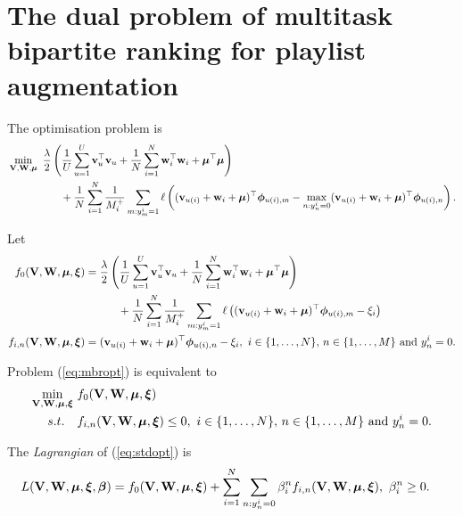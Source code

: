 \section{The dual problem of multitask bipartite ranking for playlist augmentation}

The optimisation problem is
\begin{equation}
\label{eq:mbropt}
\begin{aligned}
&\min_{\mathbf{V}, \mathbf{W}, \bm{\mu}} \ \frac{\lambda}{2} \left( \frac{1}{U} \sum_{u=1}^U \mathbf{v}_u^\top \mathbf{v}_u 
     + \frac{1}{N} \sum_{i=1}^N \mathbf{w}_i^\top \mathbf{w}_i + \bm{\mu}^\top \bm{\mu} \right) \\
& \hspace{5em}
     + \frac{1}{N} \sum_{i=1}^N \frac{1}{M_i^+} \sum_{m: y_m^i = 1} \ell \left( (\mathbf{v}_{u(i)} + \mathbf{w}_i + \bm{\mu})^\top \bm{\phi}_{u(i),m} 
     - \max_{n: y_n^i = 0} (\mathbf{v}_{u(i)} + \mathbf{w}_i + \bm{\mu})^\top \bm{\phi}_{u(i),n} \right).
\end{aligned}
\end{equation}

Let 
\begin{equation*}
\begin{aligned}
f_0(\mathbf{V}, \mathbf{W}, \bm{\mu}, \bm{\xi}) &= \frac{\lambda}{2} \left( \frac{1}{U} \sum_{u=1}^U \mathbf{v}_u^\top \mathbf{v}_u 
     + \frac{1}{N} \sum_{i=1}^N \mathbf{w}_i^\top \mathbf{w}_i + \bm{\mu}^\top \bm{\mu} \right) \\
& \hspace{3em} 
     + \frac{1}{N} \sum_{i=1}^N \frac{1}{M_i^+} \sum_{m: y_m^i = 1} 
       \ell \left( (\mathbf{v}_{u(i)} + \mathbf{w}_i + \bm{\mu})^\top \bm{\phi}_{u(i),m} - \xi_i \right) \\
f_{i,n} (\mathbf{V}, \mathbf{W}, \bm{\mu}, \bm{\xi}) &= (\mathbf{v}_{u(i)} + \mathbf{w}_i + \bm{\mu})^\top \bm{\phi}_{u(i),n} - \xi_i, \
i \in \{1,\dots,N\}, \, n \in \{1,\dots,M\} \ \mathrm{and} \ y_n^i = 0.
\end{aligned}
\end{equation*}

Problem (\ref{eq:mbropt}) is equivalent to 
\begin{equation}
\label{eq:stdopt}
\begin{aligned}
\min_{\mathbf{V}, \mathbf{W}, \bm{\mu}, \bm{\xi}} \ & f_0(\mathbf{V}, \mathbf{W}, \bm{\mu}, \bm{\xi}) \\
s.t. \quad & f_{i,n}(\mathbf{V}, \mathbf{W}, \bm{\mu}, \bm{\xi}) \le 0, \
i \in \{1,\dots,N\}, \, n \in \{1,\dots,M\} \ \mathrm{and} \ y_n^i = 0.
\end{aligned}
\end{equation}

The \emph{Lagrangian} of (\ref{eq:stdopt}) is
\begin{equation*}
\begin{aligned}
L(\mathbf{V}, \mathbf{W}, \bm{\mu}, \bm{\xi}, {\bm{\beta}}) 
&= f_0(\mathbf{V}, \mathbf{W}, \bm{\mu}, \bm{\xi}) + \sum_{i=1}^N \sum_{n: y_n^i = 0} \beta_i^n f_{i,n} (\mathbf{V}, \mathbf{W}, \bm{\mu}, \bm{\xi}), \
\beta_i^n \ge 0.
\end{aligned}
\end{equation*}

